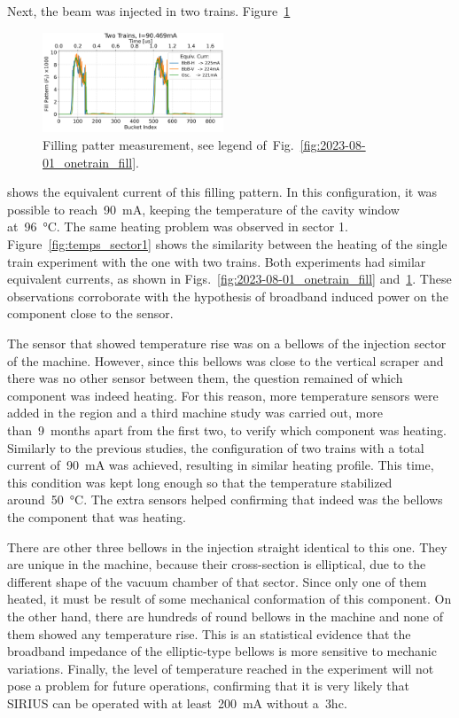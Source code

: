\documentclass
[
    a4paper,
]{jacow}
\begin{document}
    Next, the beam was injected in two trains. Figure~\ref{fig:2023-08-01_twotrains_fill}
    \begin{figure}
        \centering
        \includegraphics[width=0.48\textwidth]{THPC44_f3.png}
        \caption{Filling patter measurement, see legend of~Fig.~\ref{fig:2023-08-01_onetrain_fill}.}
        \label{fig:2023-08-01_twotrains_fill}
    \end{figure}
    shows the equivalent current of this filling pattern. In this configuration, it was possible to reach~\SI{90}{\milli\ampere}, keeping the temperature of the cavity window at~\SI{96}{\celsius}. The same heating problem was observed in sector 1. Figure~\ref{fig:temps_sector1} shows the similarity between the heating of the single train experiment with the one with two trains. Both experiments had similar equivalent currents, as shown in Figs.~\ref{fig:2023-08-01_onetrain_fill} and~\ref{fig:2023-08-01_twotrains_fill}. These observations corroborate with the hypothesis of broadband induced power on the component close to the sensor.

    The sensor that showed temperature rise was on a bellows of the injection sector of the machine. However, since this bellows was close to the vertical scraper and there was no other sensor between them, the question remained of which component was indeed heating. For this reason, more temperature sensors were added in the region and a third machine study was carried out, more than~\num{9}~months apart from the first two, to verify which component was heating. Similarly to the previous studies, the configuration of two trains with a total current of~\SI{90}{\milli\ampere} was achieved, resulting in similar heating profile. This time, this condition was kept long enough so that the temperature stabilized around~\SI{50}{\celsius}. The extra sensors helped confirming that indeed was the bellows the component that was heating.
    
    There are other three bellows in the injection straight identical to this one. They are unique in the machine, because their cross-section is elliptical, due to the different shape of the vacuum chamber of that sector. Since only one of them heated, it must be result of some mechanical conformation of this component. On the other hand, there are hundreds of round bellows in the machine and none of them showed any temperature rise. This is an statistical evidence that the broadband impedance of the elliptic-type bellows is more sensitive to mechanic variations. Finally, the level of temperature reached in the experiment will not pose a problem for future operations, confirming that it is very likely that SIRIUS can be operated with at least~\SI{200}{\milli\ampere} without a~\gls{3hc}.
\end{document}
